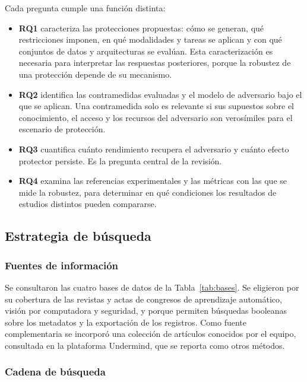 Cada pregunta cumple una función distinta:
\begin{itemize}
\item \textbf{RQ1} caracteriza las protecciones propuestas: cómo se generan, qué restricciones imponen, en qué modalidades y tareas se aplican y con qué conjuntos de datos y arquitecturas se evalúan. Esta caracterización es necesaria para interpretar las respuestas posteriores, porque la robustez de una protección depende de su mecanismo.
\item \textbf{RQ2} identifica las contramedidas evaluadas y el modelo de adversario bajo el que se aplican. Una contramedida solo es relevante si sus supuestos sobre el conocimiento, el acceso y los recursos del adversario son verosímiles para el escenario de protección.
\item \textbf{RQ3} cuantifica cuánto rendimiento recupera el adversario y cuánto efecto protector persiste. Es la pregunta central de la revisión.
\item \textbf{RQ4} examina las referencias experimentales y las métricas con las que se mide la robustez, para determinar en qué condiciones los resultados de estudios distintos pueden compararse.
\end{itemize}

\subsection{Estrategia de búsqueda}

\subsubsection{Fuentes de información}

Se consultaron las cuatro bases de datos de la Tabla~\ref{tab:bases}. Se eligieron por su cobertura de las revistas y actas de congresos de aprendizaje automático, visión por computadora y seguridad, y porque permiten búsquedas booleanas sobre los metadatos y la exportación de los registros. Como fuente complementaria se incorporó una colección de artículos conocidos por el equipo, consultada en la plataforma Undermind, que se reporta como otros métodos.



\subsubsection{Cadena de búsqueda}

